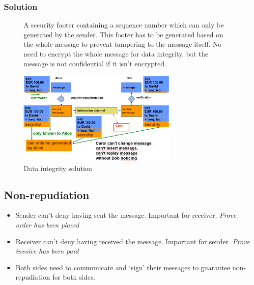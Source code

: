 \documentclass[11pt,british,faculty=ea,layout=titlefont,underline=false,titleUppercase=true,titleUnderline=true,hidelinks]{ugent2016-report}
\begin{document}
			\subsubsection{Solution} \label{subsub:data-integrity-solution}
				\begin{figure}[ht]
					\begin{minipage}{0.4\textwidth}
						A security footer containing a sequence number which can only be generated by the sender. This footer has to be generated based on the whole message to prevent tampering to the message itself.
						No need to encrypt the whole message for data integrity, but the message is not confidential if it isn't encrypted.
					\end{minipage}
					\begin{minipage}{0.58\textwidth}
						\centering
						\includegraphics[width=0.7\textwidth]{images/data-integrity-solution.png}
						\caption{Data integrity solution}
					\end{minipage}
				\end{figure}

		\subsection{Non-repudiation} \label{sub:non-repudiation}
			\begin{itemize}
				\item Sender can't deny having sent the message. Important for receiver. \textit{Prove order has been placed}
				\item Receiver can't deny having received the message. Important for sender. \textit{Prove invoice has been paid}
				\item Both sides need to communicate and `sign' their messages to guarantee non-repudiation for both sides.
			\end{itemize}
\end{document}
